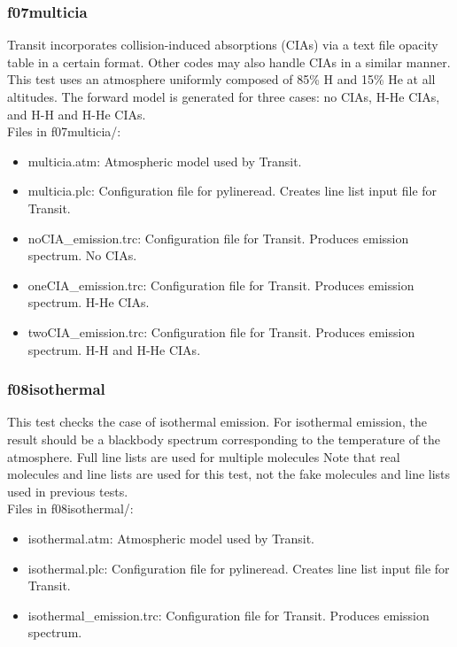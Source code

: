 \documentclass[letterpaper, 12pt]{article}
\begin{document}
\subsubsection{f07multicia}
\label{sec:multicia}
Transit incorporates collision-induced absorptions (CIAs) via a text file 
opacity table in a certain format. Other codes may also handle CIAs in a 
similar manner. This test uses an atmosphere uniformly composed of 85\% H 
and 15\% He at all altitudes. The forward model is generated for three cases: 
no CIAs, H-He CIAs, and H-H and H-He CIAs.\\

Files in f07multicia/:
\begin{itemize} \itemsep0pt
  \item multicia.atm: Atmospheric model used by Transit.
  \item multicia.plc: Configuration file for pylineread. Creates 
        line list input file for Transit.
  \item noCIA{\_}emission.trc: Configuration file for Transit. Produces 
        emission spectrum. No CIAs.
  \item oneCIA{\_}emission.trc: Configuration file for Transit. Produces 
        emission spectrum. H-He CIAs.
  \item twoCIA{\_}emission.trc: Configuration file for Transit. Produces 
        emission spectrum. H-H and H-He CIAs.
\end{itemize}

\subsubsection{f08isothermal}
\label{sec:isothermal}
This test checks the case of isothermal emission. For isothermal emission, 
the result should be a blackbody spectrum corresponding to the temperature 
of the atmosphere. Full line lists are used for multiple molecules 
Note that real molecules and line lists are used for this test, not the 
fake molecules and line lists used in previous tests.\\

Files in f08isothermal/:
\begin{itemize} \itemsep0pt
  \item isothermal.atm: Atmospheric model used by Transit.
  \item isothermal.plc: Configuration file for pylineread. Creates 
        line list input file for Transit.
  \item isothermal{\_}emission.trc: Configuration file for Transit. Produces 
        emission spectrum.
\end{itemize}
\end{document}
